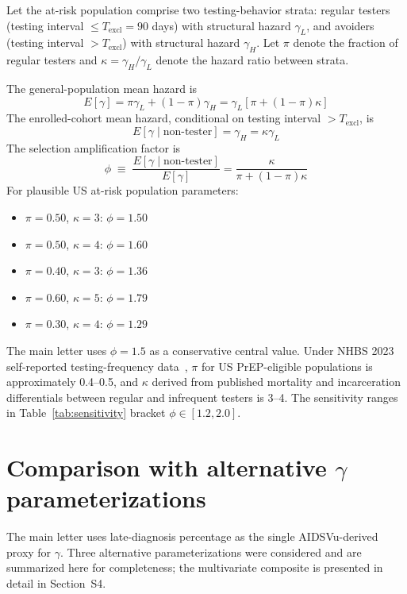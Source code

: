 \documentclass[11pt]{article}
\begin{document}
Let the at-risk population comprise two testing-behavior strata: regular testers (testing interval $\leq T_{\mathrm{excl}} = 90$ days) with structural hazard $\gamma_L$, and avoiders (testing interval $> T_{\mathrm{excl}}$) with structural hazard $\gamma_H$. Let $\pi$ denote the fraction of regular testers and $\kappa = \gamma_H/\gamma_L$ denote the hazard ratio between strata.

The general-population mean hazard is
\begin{equation}
E[\gamma] = \pi \gamma_L + (1-\pi) \gamma_H = \gamma_L [\pi + (1-\pi)\kappa]
\end{equation}
The enrolled-cohort mean hazard, conditional on testing interval $> T_{\mathrm{excl}}$, is
\begin{equation}
E[\gamma \mid \text{non-tester}] = \gamma_H = \kappa \gamma_L
\end{equation}
The selection amplification factor is
\begin{equation}
\phi \;\equiv\; \frac{E[\gamma \mid \text{non-tester}]}{E[\gamma]} = \frac{\kappa}{\pi + (1-\pi)\kappa}
\end{equation}
For plausible US at-risk population parameters:
\begin{itemize}
\item $\pi = 0.50$, $\kappa = 3$: $\phi = 1.50$
\item $\pi = 0.50$, $\kappa = 4$: $\phi = 1.60$
\item $\pi = 0.40$, $\kappa = 3$: $\phi = 1.36$
\item $\pi = 0.60$, $\kappa = 5$: $\phi = 1.79$
\item $\pi = 0.30$, $\kappa = 4$: $\phi = 1.29$
\end{itemize}
The main letter uses $\phi = 1.5$ as a conservative central value. Under NHBS 2023 self-reported testing-frequency data~\cite{nhbs2023}, $\pi$ for US PrEP-eligible populations is approximately 0.4--0.5, and $\kappa$ derived from published mortality and incarceration differentials between regular and infrequent testers is 3--4. The sensitivity ranges in Table~\ref{tab:sensitivity} bracket $\phi \in [1.2, 2.0]$.

\section{Comparison with alternative $\gamma$ parameterizations}

The main letter uses late-diagnosis percentage as the single AIDSVu-derived proxy for $\gamma$. Three alternative parameterizations were considered and are summarized here for completeness; the multivariate composite is presented in detail in Section~S4.
\end{document}
